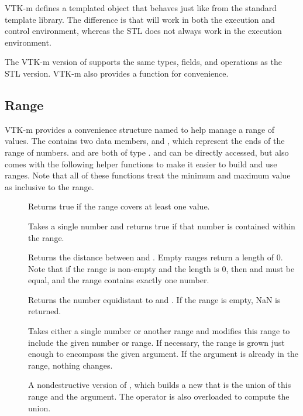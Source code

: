VTK-m defines a  templated object that
behaves just like  from the standard template
library. The difference is that  will work in both the execution
and control environment, whereas the STL  does not
always work in the execution environment.

The VTK-m version of  supports the same types, fields, and
operations as the STL version. VTK-m also provides a 
function for convenience.

\subsection{Range}
\label{sec:Range}

VTK-m provides a convenience structure named  to help manage a
range of values. The   contains two
data members,  and , which represent the ends
of the range of numbers.  and  are both of type
.  and  can be directly accessed,
but  also comes with the following helper functions
to make it easier to build and use ranges. Note that all of these functions
treat the minimum and maximum value as inclusive to the range.

\begin{description}
\item[] Returns true if the range covers at least one
  value.
\item[] Takes a single number and returns true if that
  number is contained within the range.
\item[] Returns the distance between  and
  . Empty ranges return a length of 0. Note that if the range
  is non-empty and the length is 0, then  and  must
  be equal, and the range contains exactly one number.
\item[] Returns the number equidistant to 
  and . If the range is empty, NaN is returned.
\item[] Takes either a single number or another range and
  modifies this range to include the given number or range. If necessary,
  the range is grown just enough to encompass the given argument. If the
  argument is already in the range, nothing changes.
\item[] A nondestructive version of ,
  which builds a new  that is the union of this range
  and the argument. The \textcode{+} operator is also overloaded to compute
  the union.
\end{description}

